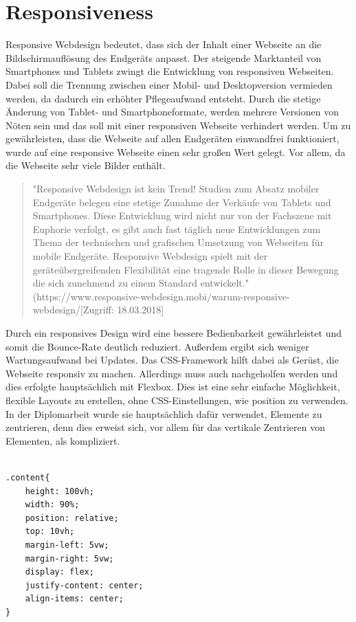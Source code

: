\section{Responsiveness}
Responsive Webdesign bedeutet, dass sich der Inhalt einer Webseite an die Bildschirmauflösung des Endgeräts anpasst. Der steigende Marktanteil von Smartphones und Tablets zwingt die Entwicklung von responsiven Webseiten. Dabei soll die Trennung zwischen einer Mobil- und Desktopversion vermieden werden, da dadurch ein erhöhter Pflegeaufwand entsteht. Durch die stetige Änderung von Tablet- und Smartphoneformate, werden mehrere Versionen von Nöten sein und das soll mit einer responsiven Webseite verhindert werden.
Um zu gewährleisten, dass die Webseite auf allen Endgeräten einwandfrei funktioniert, wurde auf eine responsive Webseite einen sehr großen Wert gelegt. Vor allem, da die Webseite sehr viele Bilder enthält.
\begin{quote}
"Responsive Webdesign ist kein Trend! Studien zum Absatz mobiler Endgeräte belegen eine stetige Zunahme der Verkäufe von Tablets und Smartphones. Diese Entwicklung wird nicht nur von der Fachszene mit Euphorie verfolgt, es gibt auch fast täglich neue Entwicklungen zum Thema der technischen und grafischen Umsetzung von Webseiten für mobile Endgeräte. Responsive Webdesign spielt mit der geräteübergreifenden Flexibilität eine tragende Rolle in dieser Bewegung die sich zunehmend zu einem Standard entwickelt." (https://www.responsive-webdesign.mobi/warum-responsive-webdesign/[Zugriff: 18.03.2018]
\end{quote}
Durch ein responsives Design wird eine bessere Bedienbarkeit gewährleistet und somit die Bounce-Rate deutlich reduziert. Außerdem ergibt sich weniger Wartungsaufwand bei Updates.  Das CSS-Framework hilft dabei als Gerüst, die Webseite responsiv zu machen. Allerdings muss auch nachgeholfen werden und dies erfolgte hauptsächlich mit Flexbox. Dies ist eine sehr einfache Möglichkeit, flexible Layouts zu erstellen, ohne CSS-Einstellungen, wie position zu verwenden. In der Diplomarbeit wurde sie hauptsächlich dafür verwendet, Elemente zu zentrieren, denn dies erweist sich, vor allem für das vertikale Zentrieren von Elementen, als kompliziert. \cite{responsive}
\leavevmode \newpage
\lstset{
  frame=leftline,
  xleftmargin=.05\textwidth
}
\begin{lstlisting}

.content{
	height: 100vh;
	width: 90%;
	position: relative;
	top: 10vh;
	margin-left: 5vw;
	margin-right: 5vw;
	display: flex;
	justify-content: center;
	align-items: center;
}

\end{lstlisting} \leavevmode \newline
